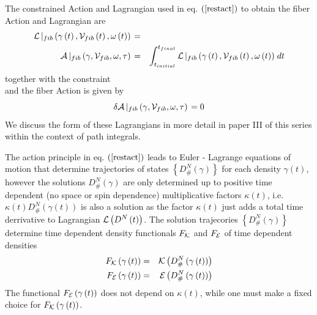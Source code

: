 The constrained Action and Lagrangian used in eq. $\left( \ref{restact}%
\right) $ to obtain the fiber Action and Lagrangian are 
\begin{eqnarray}
{\cal L}\left| _{fib}\left( \gamma \left( t\right) ,{\cal V}_{fib}\left(
t\right) ,\omega \left( t\right) \right) \right. &=&  \nonumber \\
{\cal A}\left| _{fib}\left( \gamma ,{\cal V}_{fib},\omega ,\tau \right)
\right. &=&\int_{t_{initial}}^{t_{final}}{\cal L}\left| _{fib}\left( \gamma
\left( t\right) ,{\cal V}_{fib}\left( t\right) ,\omega \left( t\right)
\right) \right. dt
\end{eqnarray}%
together with the constraint 
\begin{equation}
\end{equation}%
and the fiber Action is given by 
\begin{equation}
\delta {\cal A}\left| _{fib}\left( \gamma ,{\cal V}_{fib},\omega ,\tau
\right) \right. =0
\end{equation}%
We discuss the form of these Lagrangians in more detail in paper III of this
series within the context of path integrals.

The action principle in eq. $\left( \ref{restact}\right) $ leads to Euler -
Lagrange equations of motion that determine trajectories of states $\left\{
D_{\#}^{N}\left( \gamma \right) \right\} $ for each density $\gamma \left(
t\right) $, however the solutions $D_{\#}^{N}\left( \gamma \right) $ are
only determined up to positive time dependent (no space or spin dependence)
multiplicative factors $\kappa \left( t\right) $, i.e. $\kappa \left(
t\right) D_{\#}^{N}\left( \gamma \left( t\right) \right) $ is also a
solution as the factor $\kappa \left( t\right) $ just adds a total time
derrivative to Lagrangian ${\cal L}\left( D^{N}\left( t\right) \right) $.
The solution trajecories $\left\{ D_{\#}^{N}\left( \gamma \right) \right\} $
determine time dependent density functionals $F_{{\cal K}}$ and $F_{{\cal E}%
} $ of time dependent densities 
\begin{eqnarray}
F_{{\cal K}}\left( \gamma \left( t\right) \right) &=&{\cal K}\left(
D_{\#}^{N}\left( \gamma \left( t\right) \right) \right)  \nonumber \\
F_{{\cal E}}\left( \gamma \left( t\right) \right) &=&{\cal E}\left(
D_{\#}^{N}\left( \gamma \left( t\right) \right) \right)
\end{eqnarray}%
The functional $F_{{\cal E}}\left( \gamma \left( t\right) \right) $ does not
depend on $\kappa \left( t\right) $, while one must make a fixed choice for $%
F_{{\cal K}}\left( \gamma \left( t\right) \right) $.

